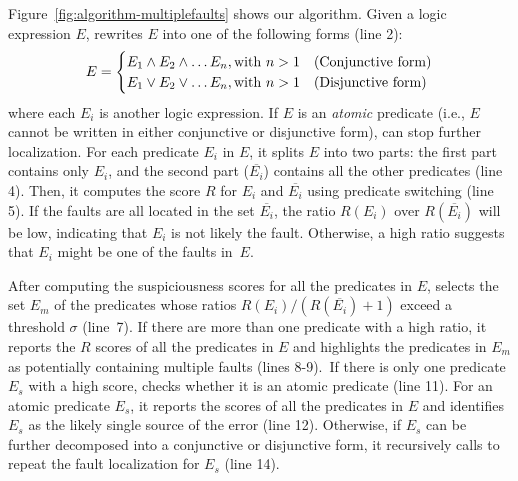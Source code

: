 Figure~\ref{fig:algorithm-multiplefaults} shows our algorithm.
Given a logic expression $E$,
\tool{} rewrites $E$ into one of the following forms (line 2):\\
\[
\small
E =
\begin{cases}
    E_1 \wedge E_2 \wedge \ldots E_n, \text{with } n > 1 & \text{(Conjunctive form)} \\
    E_1 \vee E_2 \vee \ldots E_n, \text{with } n > 1 & \text{(Disjunctive form)} \\
\end{cases}
\]
where each $E_i$ is another logic expression. If $E$ is an
\emph{atomic} predicate (i.e., $E$ cannot be written in either
conjunctive or disjunctive form), {\tool} can stop further
localization. For each predicate $E_i$ in $E$, it splits $E$ into two
parts: the first part contains only $E_i$, and the second part
($\overline{E_i}$) contains all the other predicates (line 4). Then,
it computes the score $R$ for $E_i$ and
$\overline{E_i}$ using predicate switching (line 5). If
the faults are all located in the set $\overline{E_i}$, the ratio
$R(E_i)$ over $R(\overline{E_i})$ will be low, indicating that $E_i$
is not likely the fault. Otherwise, a high ratio suggests that $E_i$
might be one of the faults in~$E$.



After computing the suspiciousness scores for all the predicates in
$E$, \tool{} selects the set $E_m$ of the predicates whose ratios
$R(E_i) / (R(\overline{E_i}) + 1)$ exceed a threshold $\sigma$
(line~7). If there are more than one predicate with a high ratio, it
reports the $R$ scores of all the predicates in $E$ and highlights the
predicates in $E_m$ as potentially containing multiple faults (lines
8-9).~If there is only one predicate $E_s$ with a high score, {\tool}
checks whether it is an atomic predicate (line 11). For an
atomic predicate $E_s$, it reports the scores of all the predicates in
$E$ and identifies $E_s$ as the likely single source of the error
(line 12). Otherwise, if $E_s$ can be further decomposed into a
conjunctive or disjunctive form, it recursively calls
 to repeat the fault localization for
$E_s$ (line 14).

